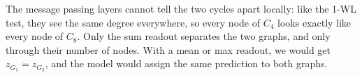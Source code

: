 \documentclass[a4paper]{article}
\begin{document}
The message passing layers cannot tell the two cycles apart locally: like the 1-WL test, they see the same degree everywhere, so every node of $C_4$ looks exactly like every node of $C_8$. Only the sum readout separates the two graphs, and only through their number of nodes. With a mean or max readout, we would get $z_{G_1} = z_{G_2}$, and the model would assign the same prediction to both graphs.




\end{document}
